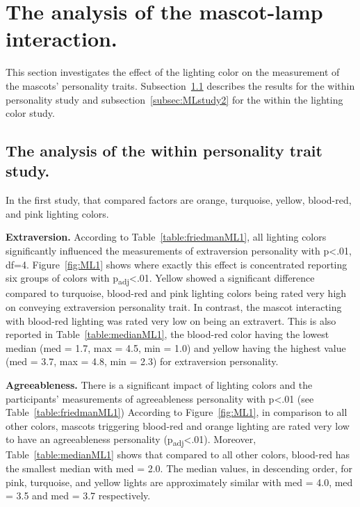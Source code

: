 \section{The analysis of the mascot-lamp interaction.}
\label{sec:m-l}
This section investigates the effect of the lighting color on the measurement of the mascots' personality traits.
Subsection~\ref{subsec:MLstudy1} describes the results for the within personality study and
subsection~\ref{subsec:MLstudy2} for the within the lighting color study.

\subsection{The analysis of the within personality trait study.}
\label{subsec:MLstudy1}
In the first study, that compared factors are orange, turquoise, yellow, blood-red, and pink lighting colors.

\par\textbf{Extraversion.}
According to Table~\ref{table:friedmanML1}, all lighting colors significantly
influenced the measurements of extraversion personality with p<.01, df=4.
Figure~\ref{fig:ML1} shows where exactly this effect is concentrated
reporting six groups of colors with p\textsubscript{adj}<.01.
Yellow showed a significant difference compared to turquoise, blood-red and pink lighting colors
being rated very high on conveying extraversion personality trait.
In contrast, the mascot interacting with blood-red lighting was rated very low on being an extravert.
This is also reported in Table~\ref{table:medianML1}, the blood-red color having
the lowest median (med = 1.7, max = 4.5, min = 1.0) and yellow having the highest
value (med = 3.7, max = 4.8, min = 2.3) for extraversion personality.

\par\textbf{Agreeableness.}
There is a significant impact of lighting colors and the participants'
measurements of agreeableness personality with p<.01 (see Table~\ref{table:friedmanML1})
According to Figure~\ref{fig:ML1}, in comparison to all other colors,
mascots triggering blood-red and orange lighting
are rated very low to have an agreeableness personality (p\textsubscript{adj}<.01).
Moreover, Table~\ref{table:medianML1} shows that compared to all other colors,
blood-red has the smallest median with med = 2.0.
The median values, in descending order, for pink, turquoise, and yellow lights are
approximately similar with med = 4.0, med = 3.5 and med = 3.7 respectively.

